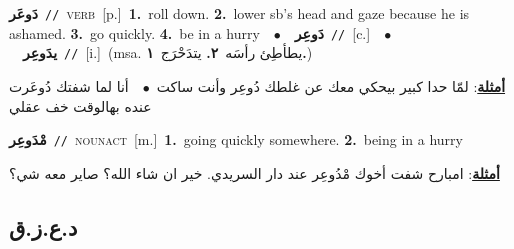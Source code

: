 \documentclass[10pt,a4paper,twoside]{article} %
\begin{document}
\begin{multicols}{2}
{\setlength\topsep{0pt}\textbf{\foreignlanguage{arabic}{دَوعَر}}\ {\color{gray}\texttt{//}\color{black}}\ \textsc{verb}\ [p.]\ \textbf{1.}~roll down.  \textbf{2.}~lower sb's head and gaze because he is ashamed.  \textbf{3.}~go quickly.  \textbf{4.}~be in a hurry\ \ $\bullet$\ \ \setlength\topsep{0pt}\textbf{\foreignlanguage{arabic}{دَوعِر}}\ {\color{gray}\texttt{//}\color{black}}\ [c.]\ \ $\bullet$\ \ \setlength\topsep{0pt}\textbf{\foreignlanguage{arabic}{يدَوعِر}}\ {\color{gray}\texttt{//}\color{black}}\ [i.]\ \color{gray}(msa. \foreignlanguage{arabic}{يطأطِئ رأسَه}~\foreignlanguage{arabic}{\textbf{٢.}}  \foreignlanguage{arabic}{يتدَحْرَج}~\foreignlanguage{arabic}{\textbf{١.}})\color{black}\  \begin{flushright}\color{gray}\foreignlanguage{arabic}{\textbf{\underline{\foreignlanguage{arabic}{أمثلة}}}: لمّا حدا كبير بيحكي معك عن غلطك دُوعِر وأنت ساكت\ $\bullet$\ \  أنا لما شفتك دُوعَرت عنده بهالوقت خف عقلي}\end{flushright}\color{black}} \vspace{2mm}

{\setlength\topsep{0pt}\textbf{\foreignlanguage{arabic}{مْدَوعِر}}\ {\color{gray}\texttt{//}\color{black}}\ \textsc{noun\textunderscore act}\ [m.]\ \textbf{1.}~going quickly somewhere.  \textbf{2.}~being in a hurry\  \begin{flushright}\color{gray}\foreignlanguage{arabic}{\textbf{\underline{\foreignlanguage{arabic}{أمثلة}}}: امبارح شفت أخوك مْدُوعِر عند دار السريدي. خير ان شاء الله؟ صاير معه شي؟}\end{flushright}\color{black}} \vspace{2mm}

\vspace{-3mm}
\subsection*{\color{blue}\foreignlanguage{arabic}{د.ع.ز.ق}\color{blue}{}} 


\end{multicols}
\end{document}
